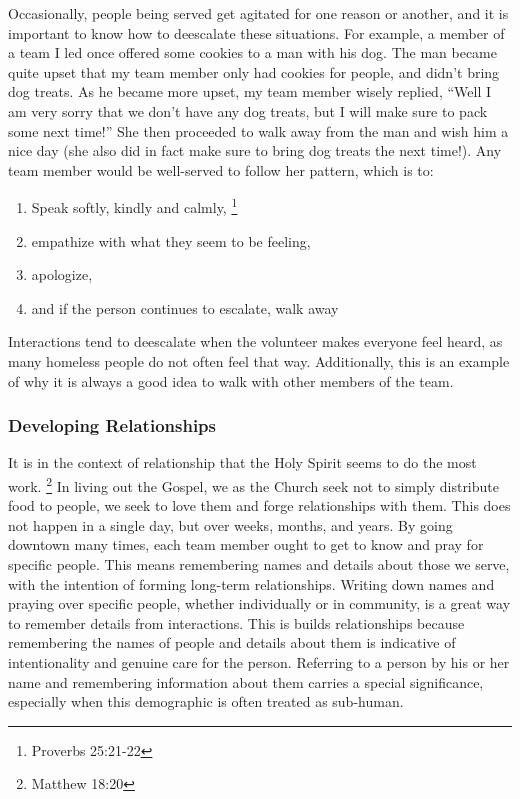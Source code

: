 \documentclass[12pt]{article}
\begin{document}
    Occasionally, people being served get agitated for one reason or another, and it is important to know how to deescalate these situations.
    For example, a member of a team I led once offered some cookies to a man with his dog.
    The man became quite upset that my team member only had cookies for people, and didn't bring dog treats.
    As he became more upset, my team member wisely replied, ``Well I am very sorry that we don't have any dog treats, but I will make sure to pack some next time!''
    She then proceeded to walk away from the man and wish him a nice day (she also did in fact make sure to bring dog treats the next time!).
    Any team member would be well-served to follow her pattern, which is to:
    \begin{enumerate}
        \item Speak softly, kindly and calmly,
            \footnote{Proverbs 25:21-22}
        \item empathize with what they seem to be feeling,
        \item apologize,
        \item and if the person continues to escalate, walk away
    \end{enumerate}
    Interactions tend to deescalate when the volunteer makes everyone feel heard, as many homeless people do not often feel that way.
    Additionally, this is an example of why it is always a good idea to walk with other members of the team.

\subsubsection{Developing Relationships}

    \qPiperCoronary
    It is in the context of relationship that the Holy Spirit seems to do the most work.
    \footnote{Matthew 18:20}
    In living out the Gospel, we as the Church seek not to simply distribute food to people, we seek to love them and forge relationships with them.
    This does not happen in a single day, but over weeks, months, and years.
    By going downtown many times, each team member ought to get to know and pray for specific people.
    This means remembering names and details about those we serve, with the intention of forming long-term relationships.
    Writing down names and praying over specific people, whether individually or in community, is a great way to remember details from interactions.
    This is builds relationships because remembering the names of people and details about them is indicative of intentionality and genuine care for the person.
    Referring to a person by his or her name and remembering information about them carries a special significance, especially when this demographic is often treated as sub-human.
\end{document}
